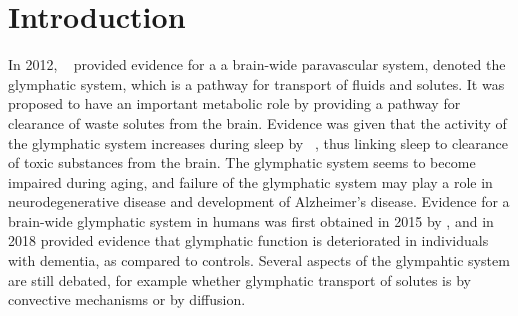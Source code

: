 \documentclass[12pt,a4paper]{article}
\begin{document}
\section{Introduction}
In 2012, ~\citet{iliff2012paravascular} provided evidence for a a brain-wide paravascular system, denoted the glymphatic system, which is a pathway for transport of fluids and solutes. It was proposed to have an important metabolic role by providing a pathway for clearance of waste solutes from the brain. Evidence was given that the activity of the glymphatic system increases during  sleep by ~\citet{xie2013sleep}, thus linking sleep to clearance of toxic substances from the brain. The glymphatic system seems to become impaired during aging, and failure of the glymphatic system may play a role in neurodegenerative disease and development of Alzheimer's disease. Evidence for a brain-wide glymphatic system in humans was first obtained in 2015 by \citet{eide2015mri}, and in 2018 \citet{ringstad2018brain} provided evidence that glymphatic function is deteriorated in individuals with dementia, as compared to controls.
Several aspects of the glympahtic system are still debated, for example whether glymphatic transport of solutes is by convective mechanisms or by diffusion.

\end{document}
